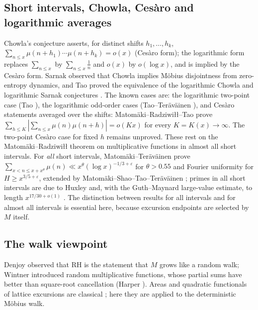 \documentclass[11pt,reqno]{amsart}
\numberwithin{equation}{section}
\theoremstyle{plain}
\theoremstyle{definition}
\theoremstyle{remark}
\newcommand{\eps}{\varepsilon}
\begin{document}
\subsection{Short intervals, Chowla, Cesàro and logarithmic averages}
Chowla's conjecture \cite{Chowla1965} asserts, for distinct shifts
$h_1,\dots,h_k$, $\sum_{n\le x}\mu(n+h_1)\cdots\mu(n+h_k)=o(x)$ (Cesàro form);
the logarithmic form replaces $\sum_{n\le x}$ by $\sum_{n\le x}\frac1n$ and
$o(x)$ by $o(\log x)$, and is implied by the Cesàro form. Sarnak
\cite{Sarnak2010} observed that Chowla implies Möbius disjointness from
zero-entropy dynamics, and Tao proved the equivalence of the logarithmic
Chowla and logarithmic Sarnak conjectures \cite{Tao2017}. The known cases
are: the logarithmic two-point case (Tao \cite{Tao2016}), the logarithmic
odd-order cases (Tao--Teräväinen \cite{TaoTeravainen2018,TaoTeravainen2019}),
and Cesàro statements averaged over the shifts: Matomäki--Radziwiłł--Tao
\cite{MRT15} prove $\sum_{h\le K}|\sum_{n\le x}\mu(n)\mu(n+h)|=o(Kx)$ for
every $K=K(x)\to\infty$. The two-point Cesàro case for fixed $h$ remains
unproved. These rest on the Matomäki--Radziwiłł theorem \cite{MR16} on
multiplicative functions in almost all short intervals. For \emph{all}
short intervals, Matomäki--Teräväinen \cite{MatomakiTeravainen2023} prove
$\sum_{x<n\le x+x^\theta}\mu(n)\ll x^\theta(\log x)^{-1/3+\eps}$ for
$\theta>0.55$ and Fourier uniformity for $H\ge x^{3/5+\eps}$, extended by
Matomäki--Shao--Tao--Teräväinen \cite{MSTT23}; primes in all short intervals
are due to Huxley \cite{Huxley1972} and, with the Guth--Maynard large-value
estimate, to length $x^{17/30+o(1)}$ \cite{GuthMaynard2026}. The distinction
between results for all intervals and for almost all intervals is essential
here, because excursion endpoints are selected by $M$ itself.

\subsection{The walk viewpoint}
\label{subsec:intro-walk}
Denjoy \cite{Denjoy1931} observed that RH is the statement that $M$ grows
like a random walk; Wintner \cite{Wintner1944} introduced random
multiplicative functions, whose partial sums have better than square-root
cancellation (Harper \cite{Harper2020}). Areas and quadratic functionals of
lattice excursions are classical
\cite{Takacs91,NguyenThe04,Richard05,Janson07,DKW15,CP17}; here they are
applied to the deterministic Möbius walk.
\end{document}
